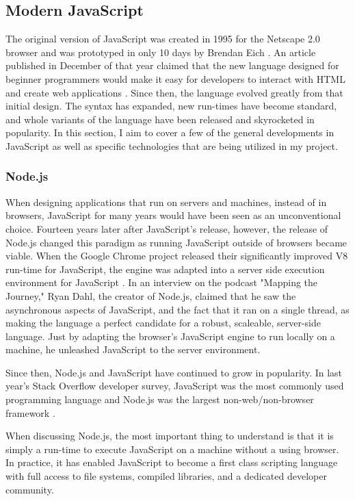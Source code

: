 \subsection{Modern JavaScript}

The original version of JavaScript was created in 1995 for the Netscape 2.0 browser and was prototyped in only 10 days by Brendan Eich \cite{redhatinc.CreatingJavaScript}.  An article published in December of that year claimed that the new language designed for beginner programmers would make it easy for developers to interact with HTML and create web applications \cite{bucholtzNewLanguageAims1995}.  Since then, the language evolved greatly from that initial design.  The syntax has expanded, new run-times have become standard, and whole variants of the language have been released and skyrocketed in popularity.  In this section, I aim to cover a few of the general developments in JavaScript as well as specific technologies that are being utilized in my project.

\subsubsection{Node.js}
When designing applications that run on servers and machines, instead of in browsers, JavaScript for many years would have been seen as an unconventional choice.  Fourteen years later after JavaScript's release, however, the release of Node.js changed this paradigm as running JavaScript outside of browsers became viable. When the Google Chrome project released their significantly improved V8 run-time for JavaScript, the engine was adapted into a server side execution environment for JavaScript \cite{pramodEpisodeInterviewRyan}.  In an interview on the podcast "Mapping the Journey," Ryan Dahl, the creator of Node.js, claimed that he saw the asynchronous aspects of JavaScript, and the fact that it ran on a single thread, as making the language a perfect candidate for a robust, scaleable, server-side language.  Just by adapting the browser's JavaScript engine to run locally on a machine, he unleashed JavaScript to the server environment.

Since then, Node.js and JavaScript have continued to grow in popularity. In last year's Stack Overflow developer survey, JavaScript was the most commonly used programming language and Node.js was the largest non-web/non-browser framework \cite{stackoverflowStackOverflowDeveloper}.

When discussing Node.js, the most important thing to understand is that it is simply a run-time to execute JavaScript on a machine without a using browser.  In practice, it has enabled JavaScript to become a first class scripting language with full access to file systems, compiled libraries, and a dedicated developer community.

